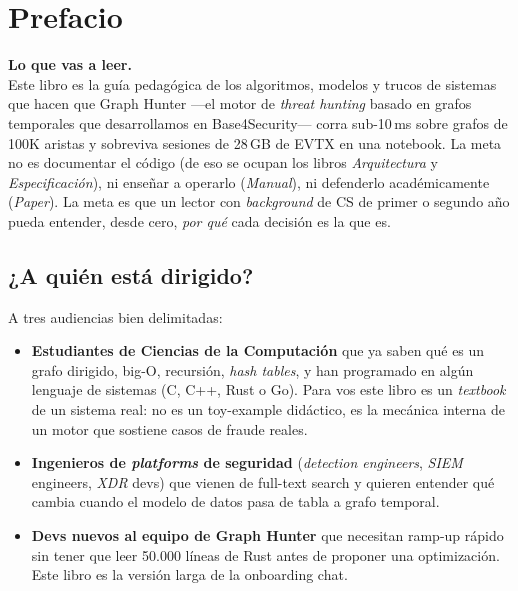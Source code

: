 \chapter*{Prefacio}

\begin{flushleft}\small
\textbf{Lo que vas a leer.}\\[0.3em]
Este libro es la guía pedagógica de los algoritmos, modelos y trucos
de sistemas que hacen que Graph Hunter ---el motor de \emph{threat
hunting} basado en grafos temporales que desarrollamos en
Base4Security--- corra sub-10\,ms sobre grafos de 100K aristas y
sobreviva sesiones de 28\,GB de EVTX en una notebook. La meta no es
documentar el código (de eso se ocupan los libros \emph{Arquitectura}
y \emph{Especificación}), ni enseñar a operarlo (\emph{Manual}), ni
defenderlo académicamente (\emph{Paper}). La meta es que un lector
con \emph{background} de CS de primer o segundo año pueda entender,
desde cero, \emph{por qué} cada decisión es la que es.
\end{flushleft}

\section*{¿A quién está dirigido?}

A tres audiencias bien delimitadas:

\begin{itemize}
    \item \textbf{Estudiantes de Ciencias de la Computación} que ya
    saben qué es un grafo dirigido, big-O, recursión, \emph{hash
    tables}, y han programado en algún lenguaje de sistemas (C, C++,
    Rust o Go). Para vos este libro es un \emph{textbook} de un
    sistema real: no es un toy-example didáctico, es la mecánica
    interna de un motor que sostiene casos de fraude reales.
    \item \textbf{Ingenieros de \emph{platforms} de seguridad}
    (\emph{detection engineers}, \emph{SIEM} engineers, \emph{XDR}
    devs) que vienen de full-text search y quieren entender qué cambia
    cuando el modelo de datos pasa de tabla a grafo temporal.
    \item \textbf{Devs nuevos al equipo de Graph Hunter} que necesitan
    ramp-up rápido sin tener que leer 50.000 líneas de Rust antes de
    proponer una optimización. Este libro es la versión larga de la
    onboarding chat.
\end{itemize}

